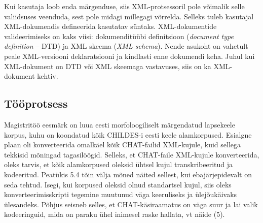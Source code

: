 \documentclass[12pt]{article}
\begin{document}
Kui kasutaja loob enda märgenduse, siis XML-protsessoril pole võimalik selle valiidsuses veenduda, sest pole midagi millegagi võrrelda. Selleks tuleb kasutajal XML-dokumendis defineerida kasutatav süntaks. XML-dokumentide valideerimiseks on kaks viisi: dokumenditüübi definitsioon (\emph{document type definition} -- DTD) ja XML skeema (\emph{XML schema}). Nende asukoht on vahetult peale XML-versiooni deklaratsiooni ja kindlasti enne dokumendi keha. Juhul kui XML-dokument on DTD või XML skeemaga vastavuses, siis on ka XML-dokument kehtiv. \citep{XML}

\subsection{Tööprotsess}

Magistritöö eesmärk on luua eesti morfoloogiliselt märgendatud lapsekeele korpus, kuhu on koondatud kõik CHILDES-i eesti keele alamkorpused. Esialgne plaan oli konverteerida omalkäel kõik CHAT-failid XML-kujule, kuid sellega tekkisid mõningad tagasilöögid. Selleks, et CHAT-faile XML-kujule konverteerida, oleks tarvis, et kõik alamkorpused oleksid ühtsel kujul transkribeeritud ja kodeeritud. Peatükis 5.4 tõin välja mõned näited sellest, kui ebajärjepidevalt on seda tehtud. Isegi, kui korpused oleksid olnud standartsel kujul, siis oleks konverteerimisskripti tegemine muutunud väga keeruliseks ja ülejõukäivaks ülesandeks. Põhjus seisneb selles, et CHAT-käsiraamatus on väga suur ja lai valik kodeeringuid, mida on paraku ühel inimesel raske hallata, vt näide (5).
\end{document}
